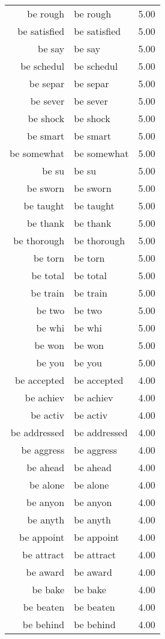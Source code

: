 \begin{table}[ht]
\begin{tabular}{rlr}
  be rough & be rough & 5.00 \\ 
  be satisfied & be satisfied & 5.00 \\ 
  be say & be say & 5.00 \\ 
  be schedul & be schedul & 5.00 \\ 
  be separ & be separ & 5.00 \\ 
  be sever & be sever & 5.00 \\ 
  be shock & be shock & 5.00 \\ 
  be smart & be smart & 5.00 \\ 
  be somewhat & be somewhat & 5.00 \\ 
  be su & be su & 5.00 \\ 
  be sworn & be sworn & 5.00 \\ 
  be taught & be taught & 5.00 \\ 
  be thank & be thank & 5.00 \\ 
  be thorough & be thorough & 5.00 \\ 
  be torn & be torn & 5.00 \\ 
  be total & be total & 5.00 \\ 
  be train & be train & 5.00 \\ 
  be two & be two & 5.00 \\ 
  be whi & be whi & 5.00 \\ 
  be won & be won & 5.00 \\ 
  be you & be you & 5.00 \\ 
  be accepted & be accepted & 4.00 \\ 
  be achiev & be achiev & 4.00 \\ 
  be activ & be activ & 4.00 \\ 
  be addressed & be addressed & 4.00 \\ 
  be aggress & be aggress & 4.00 \\ 
  be ahead & be ahead & 4.00 \\ 
  be alone & be alone & 4.00 \\ 
  be anyon & be anyon & 4.00 \\ 
  be anyth & be anyth & 4.00 \\ 
  be appoint & be appoint & 4.00 \\ 
  be attract & be attract & 4.00 \\ 
  be award & be award & 4.00 \\ 
  be bake & be bake & 4.00 \\ 
  be beaten & be beaten & 4.00 \\ 
  be behind & be behind & 4.00 \\ 

\end{tabular}
\end{table}
